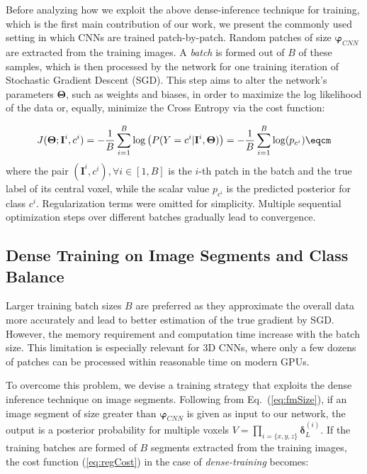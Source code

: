 Before analyzing how we exploit the above dense-inference technique for training, which is the first main contribution of our work, we present the commonly used setting in which CNNs are trained patch-by-patch. Random patches of size $\boldsymbol{\varphi}_{CNN}$ are extracted from the training images. A \textit{batch} is formed out of $B$ of these samples, which is then processed by the network for one training iteration of Stochastic Gradient Descent (SGD). This step aims to alter the network's parameters $\mathbf{\Theta}$, such as weights and biases, in order to maximize the log likelihood of the data or, equally, minimize the Cross Entropy via the cost function:

\begin{equation} \label{eq:regCost}
J(\mathbf{\Theta}; \mathbf{I}^i, c^i)  = - \frac{1}{B} \sum_{i=1}^{B} \log\left(P(Y = c^i | \mathbf{I}^i, \mathbf{\Theta})\right) = - \frac{1}{B} \sum_{i=1}^{B} \log(p_{c^i}) \eqcm
\end{equation}
where the pair $(\mathbf{I}^i, c^i), \forall{i}\in{[1,B]}$ is the $i$-th patch in the batch and the true label of its central voxel, while the scalar value $p_{c^i}$ is the predicted posterior for class $c^i$. Regularization terms were omitted for simplicity. Multiple sequential optimization steps over different batches gradually lead to convergence.

\subsection{Dense Training on Image Segments and Class Balance}
\label{subsec:denseTraining}

Larger training batch sizes $B$ are preferred as they approximate the overall data more accurately and lead to better estimation of the true gradient by SGD. However, the memory requirement and computation time increase with the batch size. This limitation is especially relevant for 3D CNNs, where only a few dozens of patches can be processed within reasonable time on modern GPUs.

To overcome this problem, we devise a training strategy that exploits the dense inference technique on image segments. Following from Eq.~(\ref{eq:fmSize}), if an image segment of size greater than $\boldsymbol{\varphi}_{CNN}$ is given as input to our network, the output is a posterior probability for multiple voxels $V=\prod_{i=\{x,y,z\}}{\boldsymbol{\delta}_L^{(i)}}$. If the training batches are formed of $B$ segments extracted from the training images, the cost function (\ref{eq:regCost}) in the case of \textit{dense-training} becomes:

